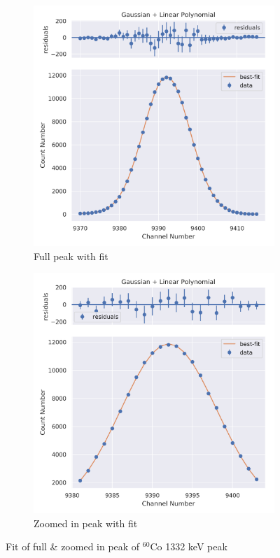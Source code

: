 \documentclass[11pt,a4paper]{article}
\newcommand{\element}[2]{$^{#2}\textrm{#1}$}
\begin{document}
\begin{figure}[H]
  \centering
  \begin{subfigure}{.5\linewidth}
    \centering
    \includegraphics[width=\linewidth]{./Images/Cobalt60/Linear/Linear_2_Full.png}
    \caption{Full peak with fit}
  \end{subfigure}%
  \begin{subfigure}{.5\linewidth}
    \centering
    \includegraphics[width=\linewidth]{./Images/Cobalt60/Linear/Linear_2_Zoom.png}
    \caption{Zoomed in peak with fit}
  \end{subfigure}
  \caption{Fit of full \& zoomed in peak of \element{Co}{60} 1332 keV peak}
\end{figure}
\clearpage
\end{document}
